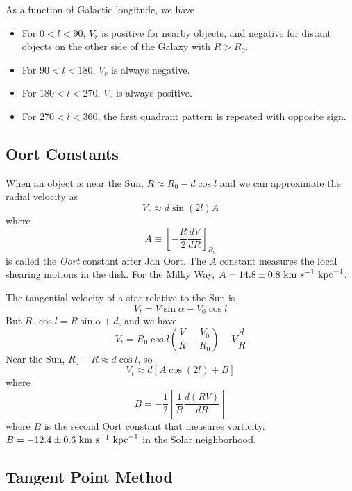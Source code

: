 \documentclass[]{article}
\begin{document}
As a function of Galactic longitude, we have
\begin{itemize}
\item For $0<l<90$, $V_r$ is positive for nearby objects,
and negative for distant objects on the other side of the
Galaxy with $R>R_0$.
\item For $90<l<180$, $V_r$ is always negative.
\item For $180<l<270$, $V_r$ is always positive.
\item For $270<l<360$, the first quadrant pattern is repeated with opposite sign.
\end{itemize}

\subsection{Oort Constants}
When an object is near the Sun, $R\approx R_0 - d \cos l$ and
we can approximate the radial velocity as
\begin{equation}
V_r \approx d \sin(2l) A
\end{equation}
\noindent
where
\begin{equation}
A \equiv \left[-\frac{R}{2} \frac{dV}{dR}\right]_{R_0}
\end{equation}
\noindent
is called the {\it Oort} constant after Jan Oort. The $A$ constant
measures the local shearing motions in the disk.
For the Milky Way, $A = 14.8\pm0.8~\mathrm{km}~s^{-1}~\mathrm{kpc}^{-1}$.

The tangential velocity of a star relative to the Sun is
\begin{equation}
V_t = V \sin \alpha - V_0 \cos l
\end{equation}
\noindent
But $R_0 \cos l = R\sin\alpha + d$, and we have
\begin{equation}
V_t = R_0 \cos l \left(\frac{V}{R} - \frac{V_0}{R_0}\right) - V\frac{d}{R}
\end{equation}
\noindent
Near the Sun, $R_0-R \approx d \cos l$, so
\begin{equation}
V_t \approx d [A \cos(2l) + B]
\end{equation}
\noindent
where
\begin{equation}
B = -\frac{1}{2}\left[\frac{1}{R}\frac{d (RV)}{dR}\right]
\end{equation}
\noindent
where $B$ is the second Oort constant that measures vorticity.
$B = -12.4\pm0.6~\mathrm{km}~\mathrm{s}^{-1}~\mathrm{kpc}^{-1}$ in the Solar neighborhood.

\subsection{Tangent Point Method}
\end{document}
